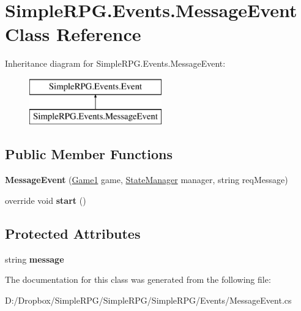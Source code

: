 \hypertarget{class_simple_r_p_g_1_1_events_1_1_message_event}{\section{Simple\+R\+P\+G.\+Events.\+Message\+Event Class Reference}
\label{class_simple_r_p_g_1_1_events_1_1_message_event}
}
Inheritance diagram for Simple\+R\+P\+G.\+Events.\+Message\+Event\+:\begin{figure}[H]
\begin{center}
\leavevmode
\includegraphics[height=2.000000cm]{class_simple_r_p_g_1_1_events_1_1_message_event}
\end{center}
\end{figure}
\subsection*{Public Member Functions}
\begin{DoxyCompactItemize}
\item 
\hypertarget{class_simple_r_p_g_1_1_events_1_1_message_event_ac726b325c3a3524d04eb0ec26613fe0f}{{\bfseries Message\+Event} (\hyperlink{class_simple_r_p_g_1_1_game1}{Game1} game, \hyperlink{class_simple_r_p_g_1_1_states_1_1_state_manager}{State\+Manager} manager, string req\+Message)}\label{class_simple_r_p_g_1_1_events_1_1_message_event_ac726b325c3a3524d04eb0ec26613fe0f}

\item 
\hypertarget{class_simple_r_p_g_1_1_events_1_1_message_event_ab615ebfc5d3227ecf36ca235e532a498}{override void {\bfseries start} ()}\label{class_simple_r_p_g_1_1_events_1_1_message_event_ab615ebfc5d3227ecf36ca235e532a498}

\end{DoxyCompactItemize}
\subsection*{Protected Attributes}
\begin{DoxyCompactItemize}
\item 
\hypertarget{class_simple_r_p_g_1_1_events_1_1_message_event_a0f7824800c128e02c3b41c641adc5d59}{string {\bfseries message}}\label{class_simple_r_p_g_1_1_events_1_1_message_event_a0f7824800c128e02c3b41c641adc5d59}

\end{DoxyCompactItemize}


The documentation for this class was generated from the following file\+:\begin{DoxyCompactItemize}
\item 
D\+:/\+Dropbox/\+Simple\+R\+P\+G/\+Simple\+R\+P\+G/\+Simple\+R\+P\+G/\+Events/Message\+Event.\+cs\end{DoxyCompactItemize}
